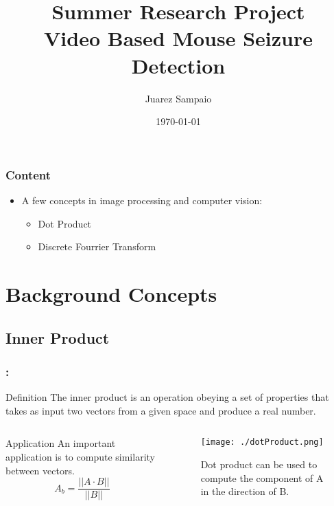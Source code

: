 \documentclass{beamer}
\title{Summer Research Project \\  Video Based Mouse Seizure Detection}
\author{Juarez Sampaio}
\institute{Rice University}
\date{\today}
\begin{document}
\begin{frame}
        \titlepage
\end{frame}

\begin{frame}[fragile]
  \frametitle{Content}
  \begin{itemize}
     \item A few concepts in image processing and computer vision:
       \begin{itemize}
           \item Dot Product
           \item Discrete Fourrier Transform
       \end{itemize}
  \end{itemize}
\end{frame}


\section{Background Concepts}
\subsection{Inner Product}

\begin{frame}
  \frametitle{\secname : \subsecname}
  \begin{block}{Definition}
    The inner product is an operation obeying a set of properties that takes as input two vectors from a given space and produce a real number.
  \end{block}

  \begin{columns}[c]
    \begin{column}[l]{.5\textwidth}
      \begin{alertblock}{Application}
        An important application is to compute similarity between vectors.
        \begin{equation}
          A_b = \frac{||A\cdot B||}{||B||}
        \end{equation}
      \end{alertblock}
    \end{column}
    \begin{column}[l]{.5\textwidth}
      \begin{figure}
        \centering
        \texttt{[image: ./dotProduct.png]}
        \caption{Dot product can be used to compute the component of A in the direction of B.}
      \end{figure}
    \end{column}
   \end{columns}

\end{frame}
\end{document}
